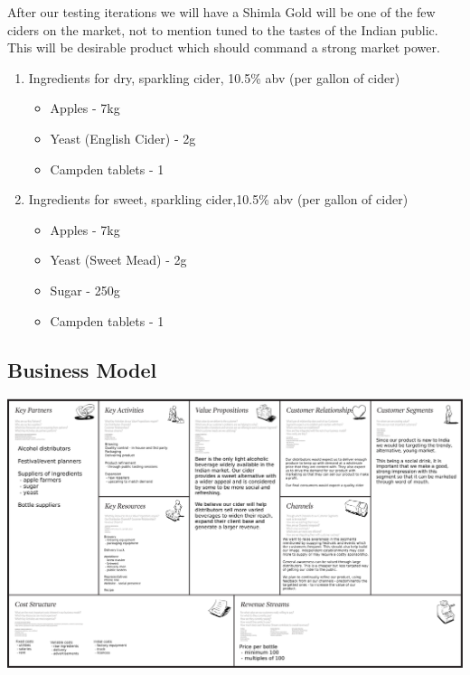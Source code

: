 \documentclass[11pt]{article}
\begin{document}
After our testing iterations we will 
have a Shimla Gold will be one of the few ciders on the market, not to mention 
tuned to the tastes of the Indian public. This will be desirable product which 
should command a strong market power.

  \begin{enumerate}
    \item Ingredients for dry, sparkling cider, 10.5\% abv (per gallon of cider)
	  \begin{itemize}
	   \item Apples - 7kg
	   \item Yeast (English Cider) - 2g
	   \item Campden tablets - 1
       \end{itemize}
	\item Ingredients for sweet, sparkling cider,10.5\% abv (per gallon of cider)
	  \begin{itemize}
	  \item Apples - 7kg
	  \item Yeast (Sweet Mead) - 2g
	  \item Sugar - 250g
	  \item Campden tablets - 1
	  \end{itemize}
	\end{enumerate}

  \newpage
  \subsection{Business Model}
  \includegraphics[angle=90,width=\textwidth,height=\textheight,keepaspectratio]
{./business_model_canvas_poster.png}

\newpage
\end{document}
